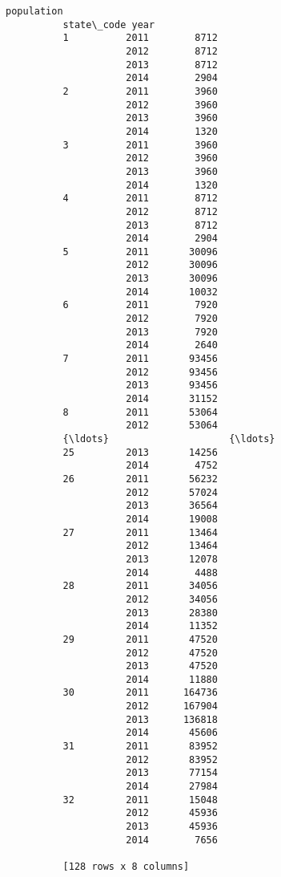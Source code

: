 \documentclass[11pt]{article}
\begin{document}
\begin{Verbatim}[commandchars=\\\{\}]
                           population  
          state\_code year              
          1          2011        8712  
                     2012        8712  
                     2013        8712  
                     2014        2904  
          2          2011        3960  
                     2012        3960  
                     2013        3960  
                     2014        1320  
          3          2011        3960  
                     2012        3960  
                     2013        3960  
                     2014        1320  
          4          2011        8712  
                     2012        8712  
                     2013        8712  
                     2014        2904  
          5          2011       30096  
                     2012       30096  
                     2013       30096  
                     2014       10032  
          6          2011        7920  
                     2012        7920  
                     2013        7920  
                     2014        2640  
          7          2011       93456  
                     2012       93456  
                     2013       93456  
                     2014       31152  
          8          2011       53064  
                     2012       53064  
          {\ldots}                     {\ldots}  
          25         2013       14256  
                     2014        4752  
          26         2011       56232  
                     2012       57024  
                     2013       36564  
                     2014       19008  
          27         2011       13464  
                     2012       13464  
                     2013       12078  
                     2014        4488  
          28         2011       34056  
                     2012       34056  
                     2013       28380  
                     2014       11352  
          29         2011       47520  
                     2012       47520  
                     2013       47520  
                     2014       11880  
          30         2011      164736  
                     2012      167904  
                     2013      136818  
                     2014       45606  
          31         2011       83952  
                     2012       83952  
                     2013       77154  
                     2014       27984  
          32         2011       15048  
                     2012       45936  
                     2013       45936  
                     2014        7656  
          
          [128 rows x 8 columns]
\end{Verbatim}
            
\end{document}
